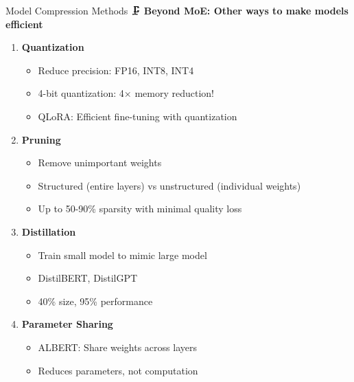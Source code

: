 \documentclass[aspectratio=169]{beamer}
\begin{document}
\begin{frame}[shrink=10]{Model Compression Methods 🗜️}
\textbf{Beyond MoE: Other ways to make models efficient}

\vspace{0.5em}

\begin{enumerate}\setlength{\itemsep}{0pt}
    \item \textbf{Quantization}
    \begin{itemize}\setlength{\itemsep}{0pt}
        \item Reduce precision: FP16, INT8, INT4
        \item 4-bit quantization: 4× memory reduction!
        \item QLoRA: Efficient fine-tuning with quantization
    \end{itemize}

    \item \textbf{Pruning}
    \begin{itemize}\setlength{\itemsep}{0pt}
        \item Remove unimportant weights
        \item Structured (entire layers) vs unstructured (individual weights)
        \item Up to 50-90\% sparsity with minimal quality loss
    \end{itemize}

    \item \textbf{Distillation}
    \begin{itemize}\setlength{\itemsep}{0pt}
        \item Train small model to mimic large model
        \item DistilBERT, DistilGPT
        \item 40\% size, 95\% performance
    \end{itemize}

    \item \textbf{Parameter Sharing}
    \begin{itemize}\setlength{\itemsep}{0pt}
        \item ALBERT: Share weights across layers
        \item Reduces parameters, not computation
    \end{itemize}
\end{enumerate}
\end{frame}
\end{document}
